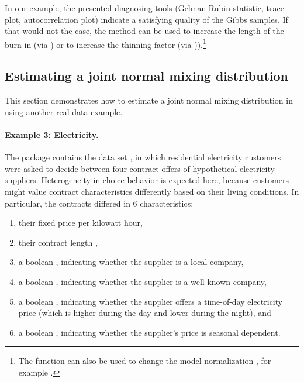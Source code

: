 \documentclass[article]{jss}
\newcommand{\fct}[1]{\code{#1()}}
\begin{document}
In our example, the presented diagnosing tools (Gelman-Rubin statistic, trace plot, autocorrelation plot) indicate a satisfying quality of the Gibbs samples. If that would not the case, the \fct{transform} method can be used to increase the length of the burn-in (via ) or to increase the thinning factor (via )).\footnote{The \fct{transform} function can also be used to change the model normalization , for example .}

\subsection{Estimating a joint normal mixing distribution} \label{subsec:normal_mix}

This section demonstrates how to estimate a joint normal mixing distribution in  using another real-data example.

\paragraph{Example 3: Electricity.}

The  package \citep{Croissant:2020} contains the data set , in which residential electricity customers were asked to decide between four contract offers of hypothetical electricity suppliers. Heterogeneity in choice behavior is expected here, because customers might value contract characteristics differently based on their living conditions. In particular, the contracts differed in 6 characteristics:

\begin{enumerate}
  \item their fixed price  per kilowatt hour,
  \item their contract length ,
  \item a boolean , indicating whether the supplier is a local company,
  \item a boolean , indicating whether the supplier is a well known company,
  \item a boolean , indicating whether the supplier offers a time-of-day electricity price (which is higher during the day and lower during the night), and
  \item a boolean , indicating whether the supplier's price is seasonal dependent.
\end{enumerate}
\end{document}
